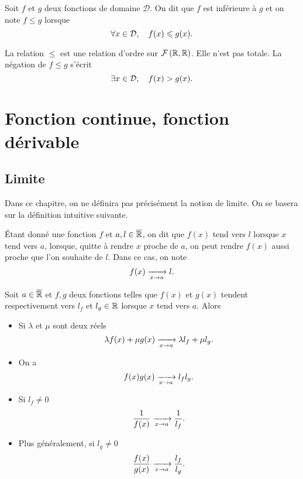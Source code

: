 \documentclass{magnolia}
\begin{document}
\begin{definition}[utile=-3]
Soit $f$ et $g$ deux fonctions de domaine $\mathcal{D}$.
On dit que $f$ est inférieure à $g$ et on note $f\leq g$ lorsque
\[\forall x\in\mathcal{D} ,\quad f(x)\leqslant g(x).\]
\end{definition}

\begin{remarques}
\remarque La relation $\leq$ est une relation d'ordre sur
  $\mathcal{F}\left(\mathbb{R},\mathbb{R}\right)$. Elle n'est pas totale.
\remarque La négation de $f\leq g$ s'écrit
  \[\exists x\in\mathcal{D} ,\quad f(x)> g(x).\]
\end{remarques}


\section{Fonction continue, fonction dérivable}

\subsection{Limite}

Dans ce chapitre, on ne définira pas précisément la notion de limite. On se basera sur la
définition intuitive suivante.

\begin{definition}[utile=-3]
Étant donné une fonction $f$ et $a,l\in\overline{\mathbb{R}}$, on dit que $f(x)$ tend vers
$l$ lorsque $x$ tend vers $a$, lorsque, quitte à rendre $x$ proche de $a$, on
peut rendre $f(x)$ aussi proche que l'on souhaite de $l$. Dans ce cas, on
note
$$f(x)\xrightarrow[x\rightarrow a]{}l.$$
\end{definition}

\begin{proposition}[utile=-3]
Soit $a\in\overline{\mathbb{R}}$ et $f, g$ deux fonctions telles que
$f(x)$ et $g(x)$ tendent respectivement vers $l_f$ et $l_g\in\mathbb{R}$ lorsque $x$
tend vers $a$. Alors
\begin{itemize}
\item Si $\lambda$ et $\mu$ sont deux réels
  \[\lambda f(x)+\mu g(x)\xrightarrow[x\rightarrow a]{} \lambda l_f+\mu l_g.\]
\item On a
  \[f(x)g(x) \xrightarrow[x\rightarrow a]{} l_f l_g.\]
\item Si $l_f\not=0$
  \[\frac{1}{f(x)}\xrightarrow[x\rightarrow a]{}\frac{1}{l_f}.\]
\item Plus généralement, si $l_g\not=0$
  \[\frac{f(x)}{g(x)}\xrightarrow[x\rightarrow a]{}\frac{l_f}{l_g}.\]
\end{itemize}
\end{proposition}
\end{document}

